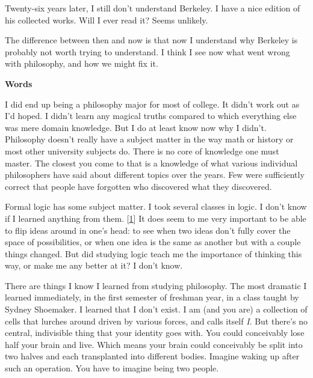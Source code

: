 Twenty-six
                  years later, I still don't understand Berkeley. I have a nice
                  edition of his collected works. Will I ever read it? Seems
                  unlikely.

The difference between then and now is
                  that now I understand why Berkeley is probably not worth
                  trying to understand. I think I see now what went wrong with
                  philosophy, and how we might fix it.

\textbf{Words}

I did end up being a philosophy major for most of
                  college. It didn't work out as I'd hoped. I didn't learn any
                  magical truths compared to which everything else was mere
                  domain knowledge. But I do at least know now why I didn't.
                  Philosophy doesn't really have a subject matter in the way
                  math or history or most other university subjects do. There is
                  no core of knowledge one must master. The closest you come to
                  that is a knowledge of what various individual philosophers
                  have said about different topics over the years. Few were
                  sufficiently correct that people have forgotten who discovered
                  what they discovered.

Formal logic has some subject
                  matter. I took several classes in logic. I don't know if I
                  learned anything from them.
                  [\href{\#f1n}{1}]
                  It does seem to me very important to be able to flip ideas
                  around in one's head: to see when two ideas don't fully cover
                  the space of possibilities, or when one idea is the same as
                  another but with a couple things changed. But did studying
                  logic teach me the importance of thinking this way, or make me
                  any better at it? I don't know.

There are things I
                  know I learned from studying philosophy. The most dramatic I
                  learned immediately, in the first semester of freshman year,
                  in a class taught by Sydney Shoemaker. I learned that I don't
                  exist. I am (and you are) a collection of cells that lurches
                  around driven by various forces, and calls itself \emph{I}.
                  But there's no central, indivisible thing that your identity
                  goes with. You could conceivably lose half your brain and
                  live. Which means your brain could conceivably be split into
                  two halves and each transplanted into different bodies.
                  Imagine waking up after such an operation. You have to imagine
                  being two people.

